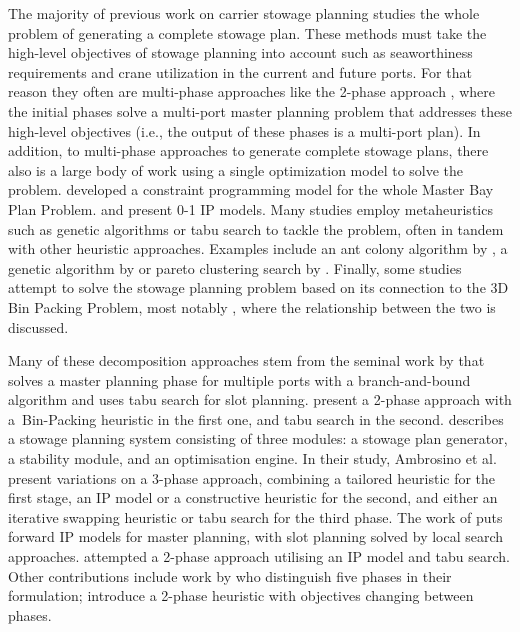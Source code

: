 The majority of previous work on carrier stowage planning studies the whole problem of generating a complete stowage plan. These methods must take the high-level objectives of stowage planning into account such as seaworthiness requirements and crane utilization in the current and future ports. For that reason they often are multi-phase approaches like the 2-phase approach \citep[e.g.,][]{AlbertosThesis,pacino11}, where the initial phases solve a multi-port master planning problem that addresses these high-level objectives (i.e., the output of these phases is a multi-port plan).
In addition, to multi-phase approaches to generate complete stowage plans, there also is a large body of work using a single optimization model to solve the problem. \citet{AS98} developed a constraint programming model for the whole Master Bay Plan Problem. \citet{BB92} and \citet{LTCD08} present 0-1 IP models. Many studies employ metaheuristics such as genetic algorithms or tabu search to tackle the problem, often in tandem with other heuristic approaches. Examples include an ant colony algorithm by \citep{H13}, a genetic algorithm by \citep{ZL15} or pareto clustering search by \citep{AACS16}. Finally, some studies attempt to solve the stowage planning problem based on its connection to the 3D Bin Packing Problem, most notably \citep{ST03}, where the relationship between the two is discussed.


Many of these decomposition approaches stem from the seminal work by \citet{roach00} that solves a master planning phase for multiple ports with a branch-and-bound algorithm and uses tabu search for slot planning. \citet{ZLJ05} present a 2-phase approach with a~Bin-Packing heuristic in the first one, and tabu search in the second. \citep{MLJYFA10A} describes a stowage planning system consisting of three modules: a stowage plan generator, a stability module, and an optimisation engine. In their study, Ambrosino et al. \cite{AAPS09,AAPS10,APS15} present variations on a 3-phase approach, combining a tailored heuristic for the first stage, an IP model or a constructive heuristic for the second, and either an iterative swapping heuristic or tabu search for the third phase. The work of \citet{pacino11} puts forward IP models for master planning, with slot planning solved by local search approaches. \citet{L12} attempted a 2-phase approach utilising an IP model and tabu search. Other contributions include work by \citet{N13} who distinguish five phases in their formulation; \citet{LFH15} introduce a 2-phase heuristic with objectives changing between phases.    


